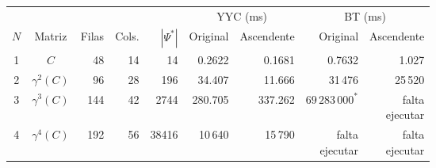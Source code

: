 {\scriptsize
\setlength{\tabcolsep}{3pt}
\begin{tabular}{c c r r r r r r r}
\toprule
\multicolumn{5}{c}{} & \multicolumn{2}{c}{YYC (ms)} & \multicolumn{2}{c}{BT (ms)} \\
\cmidrule(lr){6-7}\cmidrule(lr){8-9}
$N$ & Matriz & Filas & Cols. & $|\Psi^*|$ & Original & Ascendente & Original & Ascendente \\
\midrule
1 & $C$ & 48 & 14 & 14 & 0.2622 & 0.1681 & 0.7632 & 1.027 \\
2 & $\gamma^{2}(C)$ & 96 & 28 & 196 & 34.407 & 11.666 & 31\,476 & 25\,520 \\
3 & $\gamma^{3}(C)$ & 144 & 42 & 2744 & 280.705 & 337.262 & $69\,283\,000^{*}$ & \shortstack{falta\\ejecutar} \\
4 & $\gamma^{4}(C)$ & 192 & 56 & 38416 & 10\,640 & 15\,790 & \shortstack{falta\\ejecutar} & \shortstack{falta\\ejecutar} \\
\bottomrule
\end{tabular}
}
